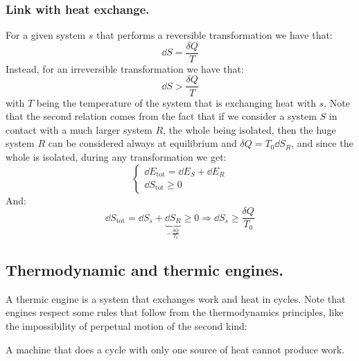 \documentclass[10pt,a4paper]{book}
\begin{document}
\subsubsection{Link with heat exchange.}
For a given system $s$ that performs a reversible transformation we have that:
\[
\dd S = \frac{\delta Q}{T}
\]
Instead, for an irreversible transformation we have that:
\[
\dd S > \frac{\delta Q}{T}
\]
with $T$ being the temperature of the system that is exchanging heat with $s$.
Note that the second relation comes from the fact that if we consider a system $S$ in contact with a much larger system $R$, the whole being isolated, then the huge system $R$ can be considered always at equilibrium and $\delta Q = T_0 \dd S_R$, and since the whole is isolated, during any transformation we get:
\[
\begin{cases}
\dd E_\text{tot} = \dd E_S + \dd E_R\\
\dd S_\text{tot} \geq 0
\end{cases}
\]
And:
\[
\dd S_\text{tot} = \dd S_s + \underbrace{\dd S_R}_{-\frac{\delta Q}{T_0}} \geq 0 \Rightarrow \dd S_s \geq \frac{\delta Q}{T_0}
\]

\subsection{Thermodynamic and thermic engines.}
A thermic engine is a system that exchanges work and heat in cycles. Note that engines respect some rules that follow from the thermodynamics principles, like the impossibility of perpetual motion of the second kind:
\begin{center}
A machine that does a cycle with only one source of heat cannot produce work.
\end{center}
\end{document}
